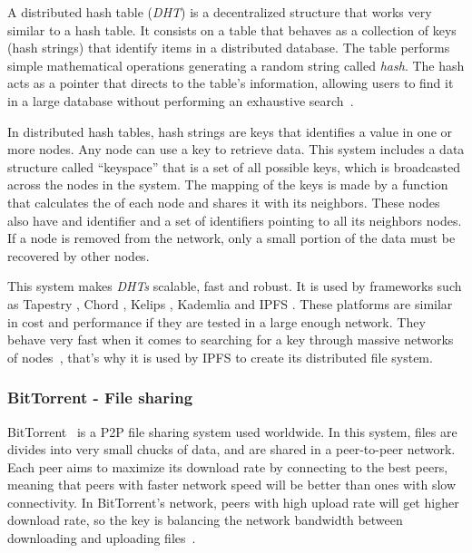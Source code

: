 A distributed hash table (\emph{DHT}) is a decentralized structure that works
very similar to a hash table. It consists on a table that behaves as a
collection of keys (hash strings) that identify items in a distributed database.
The table performs simple mathematical operations generating a random string
called \emph{hash}. The hash acts as a pointer that directs to the table's
information, allowing users to find it in a large database without performing an
exhaustive search~\cite{kaluszka2010distributed}.

In distributed hash tables, hash strings are keys that identifies a value in one
or more nodes. Any node can use a key to retrieve data. This system includes a
data structure called ``keyspace'' that is a set of all possible keys, which is
broadcasted across the nodes in the system. The mapping of the keys is made by a
function that calculates the  of each node and shares it with its
neighbors. These nodes also have and identifier and a set of identifiers
pointing to all its neighbors nodes. If a node is removed from the network, only
a small portion of the data must be recovered by other
nodes\cite{kaluszka2010distributed}.

This system makes \emph{DHTs} scalable, fast and robust. It is used by
frameworks such as Tapestry \cite{zhao2004tapestry}, Chord
\cite{stoica2001chord}, Kelips \cite{gupta2003kelips}, Kademlia
\cite{maymounkov2002kademlia} and IPFS \cite{benet2014ipfs}. These platforms are
similar in cost and performance if they are tested in a large enough network.
They behave very fast when it comes to searching for a key through massive
networks of nodes~\cite{li2004comparing}, that's why it is used by IPFS to
create its distributed file system.

\subsubsection*{BitTorrent - File sharing}
\label{tech:sec:ipfs:bt}
BitTorrent~\cite{cohen2003incentives} is a P2P file sharing system used
worldwide. In this system, files are divides into very small chucks of data, and
are shared in a peer-to-peer network. Each peer aims to maximize its download
rate by connecting to the best peers, meaning that peers with faster network
speed will be better than ones with slow connectivity. In BitTorrent's network,
peers with high upload rate will get higher download rate, so the key is
balancing the network bandwidth between downloading and uploading
files~\cite{pouwelse2005bittorrent}.

